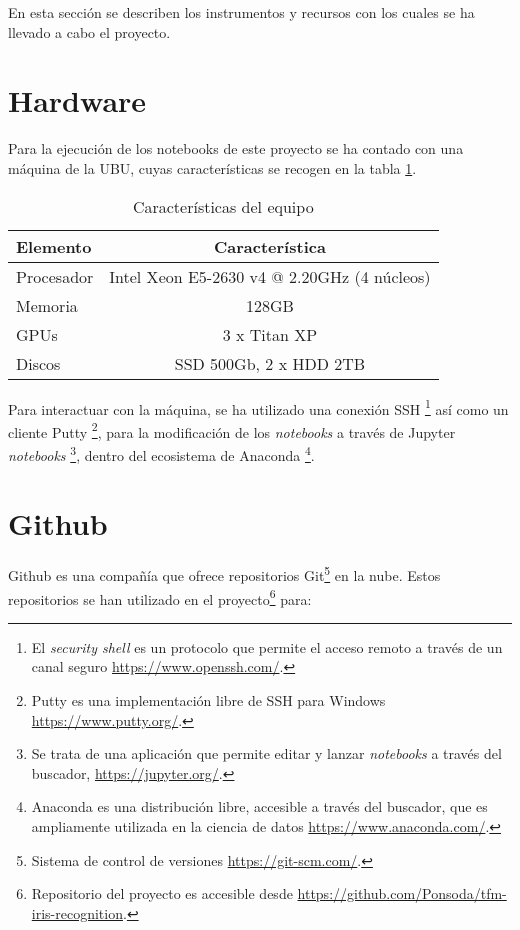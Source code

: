  \label{capitulo4}

En esta sección se describen los instrumentos y recursos con los cuales se ha llevado a cabo el proyecto. 

\section{Hardware}

Para la ejecución de los notebooks de este proyecto se ha contado con una máquina de la UBU, cuyas características se recogen en la tabla \ref{caracteristicaspc}.

\begin{table}[h!]
\begin{tabular}{l c}
Elemento & Característica \\
\hline
Procesador & Intel Xeon E5-2630 v4 @ 2.20GHz (4 núcleos)\\
Memoria & 128GB\\
GPUs & 3 x Titan XP\\
Discos & SSD 500Gb, 2 x HDD 2TB\\
\end{tabular}
\caption{\label{caracteristicaspc} Características del equipo}
\end{table}

Para interactuar con la máquina, se ha utilizado una conexión SSH \footnote{El \textit{security shell} es un protocolo que permite el acceso remoto a través de un canal seguro \url{https://www.openssh.com/}.} así como un cliente Putty \footnote{Putty es una implementación libre de SSH para Windows \url{https://www.putty.org/}.}, para la modificación de los \textit{notebooks} a través de Jupyter \textit{notebooks} \footnote{Se trata de una aplicación que permite editar y lanzar \textit{notebooks} a través del buscador, \url{https://jupyter.org/}.}, dentro del ecosistema de Anaconda \footnote{Anaconda es una distribución libre, accesible a través del buscador, que es ampliamente utilizada en la ciencia de datos \url{https://www.anaconda.com/}.}.

\section{Github}

Github es una compañía que ofrece repositorios Git\footnote{Sistema de control de versiones \url{https://git-scm.com/}.} en la nube. 
Estos repositorios se han utilizado en el proyecto\footnote{Repositorio del proyecto es accesible desde \url{https://github.com/Ponsoda/tfm-iris-recognition}.} para:

